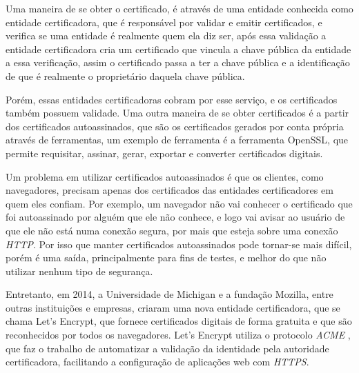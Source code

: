 Uma maneira de se obter o certificado, é através de uma entidade conhecida como
entidade certificadora, que é responsável por validar e emitir certificados, e
verifica se uma entidade é realmente quem ela diz ser, após essa validação a
entidade certificadora cria um certificado que vincula a chave pública da entidade
a essa verificação, assim o certificado passa a ter a chave pública e a
identificação de que é realmente o proprietário daquela chave pública.

Porém, essas entidades certificadoras cobram por esse serviço, e os certificados também
possuem validade. Uma outra maneira de se obter certificados é a partir dos certificados
autoassinados, que são os certificados gerados por conta própria através de
ferramentas, um exemplo de ferramenta é a ferramenta OpenSSL, que permite requisitar,
assinar, gerar, exportar e converter certificados digitais.

Um problema em utilizar certificados autoassinados é que os clientes, como navegadores,
precisam apenas dos certificados das entidades certificadores em quem eles confiam. Por
exemplo, um navegador não vai conhecer o certificado que foi autoassinado por
alguém que ele não conhece, e logo vai avisar ao usuário de que ele não está numa
conexão segura, por mais que esteja sobre uma conexão \textit{HTTP}. Por isso que
 manter certificados
autoassinados pode tornar-se mais difícil, porém é uma saída, principalmente para
fins de testes, e melhor do que não utilizar nenhum tipo de segurança.

Entretanto, em 2014, a Universidade de Michigan e a fundação Mozilla, entre outras 
instituições e empresas, criaram uma nova entidade certificadora, que se chama 
Let's Encrypt, que fornece certificados digitais de forma gratuita e que são 
reconhecidos por todos os navegadores. Let's Encrypt utiliza o protocolo \textit{ACME} \cite{ACME}, que faz o trabalho de automatizar a validação da identidade pela autoridade 
certificadora, facilitando a configuração de aplicações web com \textit{HTTPS}. 
